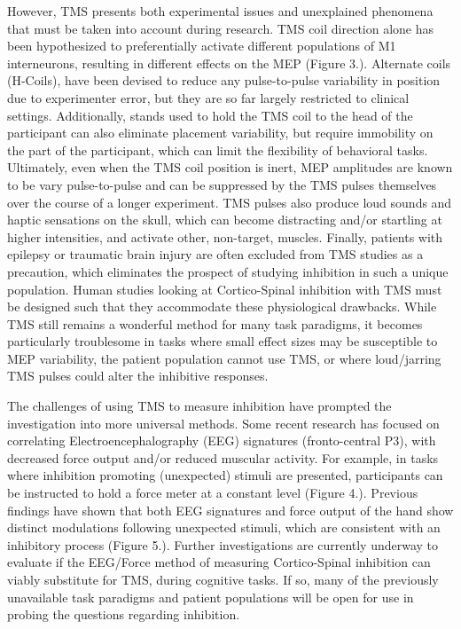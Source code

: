 \documentclass[]{article}
\begin{document}
However, TMS presents both experimental issues and unexplained phenomena
that must be taken into account during research. TMS coil direction
alone has been hypothesized to preferentially activate different
populations of M1 interneurons, resulting in different effects on the
MEP (Figure 3.). Alternate coils (H-Coils), have been devised to reduce
any pulse-to-pulse variability in position due to experimenter error,
but they are so far largely restricted to clinical settings.
Additionally, stands used to hold the TMS coil to the head of the
participant can also eliminate placement variability, but require
immobility on the part of the participant, which can limit the
flexibility of behavioral tasks. Ultimately, even when the TMS coil
position is inert, MEP amplitudes are known to be vary pulse-to-pulse
and can be suppressed by the TMS pulses themselves over the course of a
longer experiment. TMS pulses also produce loud sounds and haptic
sensations on the skull, which can become distracting and/or startling
at higher intensities, and activate other, non-target, muscles. Finally,
patients with epilepsy or traumatic brain injury are often excluded from
TMS studies as a precaution, which eliminates the prospect of studying
inhibition in such a unique population. Human studies looking at
Cortico-Spinal inhibition with TMS must be designed such that they
accommodate these physiological drawbacks. While TMS still remains a
wonderful method for many task paradigms, it becomes particularly
troublesome in tasks where small effect sizes may be susceptible to MEP
variability, the patient population cannot use TMS, or where
loud/jarring TMS pulses could alter the inhibitive responses.

The challenges of using TMS to measure inhibition have prompted the
investigation into more universal methods. Some recent research has
focused on correlating Electroencephalography (EEG) signatures
(fronto-central P3), with decreased force output and/or reduced muscular
activity. For example, in tasks where inhibition promoting (unexpected)
stimuli are presented, participants can be instructed to hold a force
meter at a constant level (Figure 4.). Previous findings have shown that
both EEG signatures and force output of the hand show distinct
modulations following unexpected stimuli, which are consistent with an
inhibitory process (Figure 5.). Further investigations are currently
underway to evaluate if the EEG/Force method of measuring Cortico-Spinal
inhibition can viably substitute for TMS, during cognitive tasks. If so,
many of the previously unavailable task paradigms and patient
populations will be open for use in probing the questions regarding
inhibition.
\end{document}
